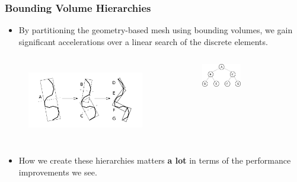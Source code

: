 \documentclass[12pt]{beamer}
\begin{document}
\begin{frame}
\frametitle{Bounding Volume Hierarchies}

\begin{itemize}
  \item By partitioning the geometry-based mesh using bounding volumes, we gain significant accelerations over a linear search of the discrete elements.
\end{itemize}

\begin{columns}
  \begin{figure}
    \centering
    \includegraphics[width=1.1\textwidth]{./images/bvh_2d_ex_w_labels.png} 
    \cite{gottschalk1996obbtree}
  \end{figure}
  
  \begin{figure}
    \centering
    \includegraphics[width=0.5\textwidth]{./images/binary_graph.png}
  \end{figure}
\end{columns}

\vfill

\begin{itemize}
  \item How we create these hierarchies matters \textbf{a lot} in terms of the performance improvements we see.
\end{itemize}

\end{frame}
\end{document}
